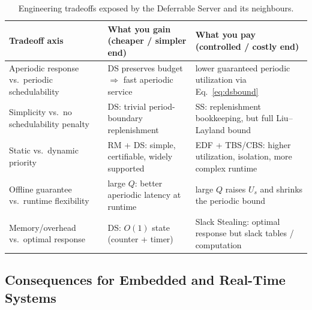 \documentclass[conference]{IEEEtran}
\begin{document}
\begin{table}[t]
\caption{Engineering tradeoffs exposed by the Deferrable Server and its neighbours.}
\label{tab:tradeoffs}
\centering
\renewcommand{\arraystretch}{1.25}
\begin{tabular}{p{4.2cm} p{6.0cm} p{6.0cm}}
\toprule
\textbf{Tradeoff axis} & \textbf{What you gain (cheaper / simpler end)} & \textbf{What you pay (controlled / costly end)} \\
\midrule
Aperiodic response vs.\ periodic schedulability & DS preserves budget $\Rightarrow$ fast aperiodic service & lower guaranteed periodic utilization via Eq.~\eqref{eq:dsbound} \\
\midrule
Simplicity vs.\ no schedulability penalty & DS: trivial period-boundary replenishment & SS: replenishment bookkeeping, but full Liu--Layland bound \\
\midrule
Static vs.\ dynamic priority & RM + DS: simple, certifiable, widely supported & EDF + TBS/CBS: higher utilization, isolation, more complex runtime \\
\midrule
Offline guarantee vs.\ runtime flexibility & large $Q$: better aperiodic latency at runtime & large $Q$ raises $U_s$ and shrinks the periodic bound \\
\midrule
Memory/overhead vs.\ optimal response & DS: $O(1)$ state (counter + timer) & Slack Stealing: optimal response but slack tables / computation \\
\bottomrule
\end{tabular}
\end{table}

\subsection{Consequences for Embedded and Real-Time Systems}
\end{document}

